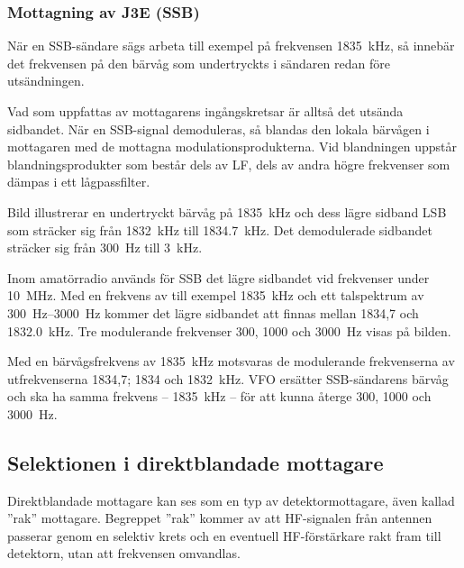 \subsubsection{Mottagning av J3E (SSB)}

När en SSB-sändare sägs arbeta till exempel på frekvensen
\SI{1835}{\kilo\hertz}, så innebär det frekvensen på den bärvåg som undertryckts
i sändaren redan före utsändningen.

Vad som uppfattas av mottagarens ingångskretsar är alltså det utsända sidbandet.
När en SSB-signal demoduleras, så blandas den lokala bärvågen i mottagaren med
de mottagna modulationsprodukterna.
Vid blandningen uppstår blandningsprodukter som består dels av LF, dels av
andra högre frekvenser som dämpas i ett lågpassfilter.

Bild  illustrerar en undertryckt bärvåg på
\SI{1835}{\kilo\hertz} och dess lägre sidband LSB som sträcker sig från
\SI{1832}{\kilo\hertz} till \SI{1834,7}{\kilo\hertz}.
Det demodulerade sidbandet sträcker sig från \SI{300}{\hertz} till
\SI{3}{\kilo\hertz}.

Inom amatörradio används för SSB det lägre sidbandet vid frekvenser
under \SI{10}{\mega\hertz}.
Med en frekvens av till exempel \SI{1835}{\kilo\hertz} och ett talspektrum av
\SIrange{300}{3000}{\hertz} kommer det lägre sidbandet att finnas mellan 1834,7
och \SI{1832,0}{\kilo\hertz}.
Tre modulerande frekvenser 300, 1000 och \SI{3000}{\hertz} visas på bilden.

Med en bärvågsfrekvens av \SI{1835}{\kilo\hertz} motsvaras de modulerande
frekvenserna av utfrekvenserna 1834,7; 1834 och \SI{1832}{\kilo\hertz}.
VFO ersätter SSB-sändarens bärvåg och ska ha samma frekvens --
\SI{1835}{\kilo\hertz} -- för att kunna återge 300, 1000 och \SI{3000}{\hertz}.

\newpage
\subsection{Selektionen i direktblandade mottagare}
\label{selektion_direktblandade}

Direktblandade mottagare kan ses som en typ av detektormottagare, även
kallad ''rak'' mottagare.
Begreppet ''rak'' kommer av att HF-signalen från antennen passerar genom en
selektiv krets och en eventuell HF-förstärkare rakt fram till detektorn,
utan att frekvensen omvandlas.

